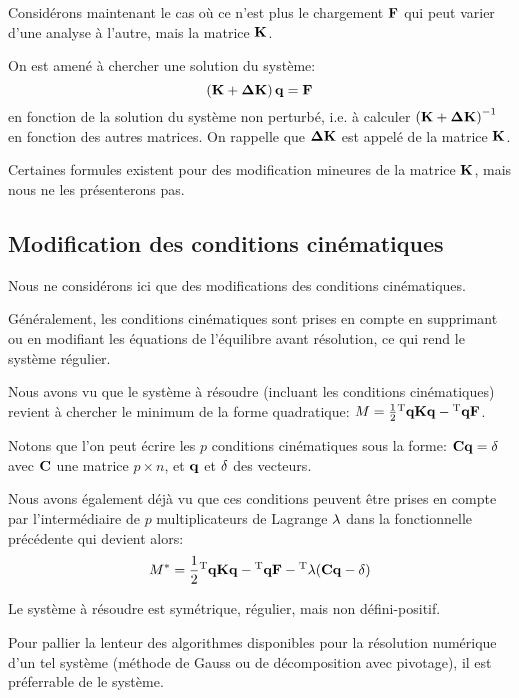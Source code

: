 Considérons maintenant le cas où ce n'est plus le chargement $\mathbf{F}$ qui peut varier d'une analyse
à l'autre, mais la matrice $\mathbf{K}$.

On est amené à chercher une solution du système:
\begin{equation}
\left(\mathbf{K}+\mathbf{\Delta K}\right)\mathbf{q}=\mathbf{F}
\end{equation}
en fonction de la solution du système non perturbé, i.e. à calculer $\left(\mathbf{K}+\mathbf{\Delta K}\right)^{-1}$
en fonction des autres matrices. On rappelle que $\mathbf{\Delta K}$ est appelé 
 de la matrice $\mathbf{K}$.

Certaines formules existent pour des modification mineures de la matrice $\mathbf{K}$, mais nous ne les
présenterons pas.

\medskip
\subsection{Modification des conditions cinématiques}

Nous ne considérons ici que des modifications des conditions cinématiques.

Généralement, les conditions cinématiques sont prises en compte en supprimant ou en
modifiant les équations de l'équilibre avant résolution, ce qui rend le système régulier.

Nous avons vu que le système à résoudre (incluant les conditions cinématiques) revient
à chercher le minimum de la forme quadratique: $M=\frac12 {}^\mathrm{T}\mathbf{q}\mathbf{K}\mathbf{q} -{}^\mathrm{T}\mathbf{q}\mathbf{F}$.

Notons que l'on peut écrire les $p$ conditions cinématiques sous la forme:
$\mathbf{C}\mathbf{q} = \mathbf{\delta}$
avec $\mathbf{C}$ une matrice $p\times n$, et $\mathbf{q}$ et $\mathbf{\delta}$ des vecteurs.

Nous avons également déjà vu que ces conditions peuvent être prises en compte
par l'intermédiaire de $p$ multiplicateurs de Lagrange $\mathbf{\lambda}$ dans la fonctionnelle précédente
qui devient alors:
\begin{equation}
M^*=\frac12 {}^\mathrm{T}\mathbf{q}\mathbf{K}\mathbf{q} -{}^\mathrm{T}\mathbf{q}\mathbf{F} - {}^\mathrm{T}\mathbf{\lambda}(\mathbf{C}\mathbf{q} - \mathbf{\delta})
\end{equation}

Le système à résoudre est symétrique, régulier, mais non défini-positif.


\medskip
Pour pallier la lenteur des algorithmes disponibles pour la résolution numérique d'un tel
système (méthode de Gauss ou de décomposition avec pivotage), il est préferrable
de  le système.

